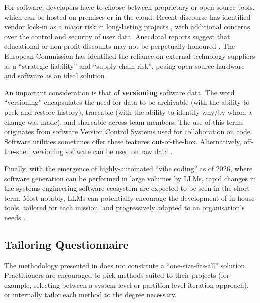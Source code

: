 \documentclass[a4paper,nobib,justified,final]{tufte-book}
\begin{document}
For software, developers have to choose between proprietary or open-source tools, which can be hosted on-premises or in the cloud.
Recent discourse has identified vendor lock-in as a major risk in long-lasting projects \autocite{lundellPerceivedActualLockin2021}, with additional concerns over the control and security of user data. Anecdotal reports suggest that educational or non-profit discounts may not be perpetually honoured \autocite{kalamSlackExtortingUs2025,elodidthatMaxonStudentLicenses2024}. The European Commission has identified the reliance on external technology suppliers as a ``strategic liability'' and ``supply chain risk'', posing open-source hardware and software as an ideal solution \autocite{europeancommissionCommissionOpensCall2026,pageBrusselsPlotsOpen2026}.

An important consideration is that of \textbf{versioning} software data. The word ``versioning'' encapsulates the need for data to be archivable (with the ability to peek and restore history), traceable (with the ability to identify why/by whom a change was made), and shareable across team members. The use of this terms originates from software Version Control Systems used for collaboration on code. Software utilities sometimes offer these features out-of-the-box. Alternatively, off-the-shelf versioning software can be used on raw data \autocite{broschIntroductionModelVersioning2012}.

Finally, with the emergence of highly-automated ``vibe coding'' as of 2026, where software generation can be performed in large volumes by \acsp{LLM}, rapid changes in the systems engineering software ecosystem are expected to be seen in the short-term. Most notably, \acsp{LLM} can potentially encourage the development of in-house tools, tailored for each mission, and progressively adapted to an organisation's needs \autocite{liscioRIPLowCode2026}.

\subsection{Tailoring Questionnaire}

The methodology presented in  does not constitute a ``one-size-fits-all'' solution.
Practitioners are encouraged to pick methods suited to their projects (for example, selecting between a system-level or partition-level iteration approach), or internally tailor each method to the degree necessary.
\end{document}
